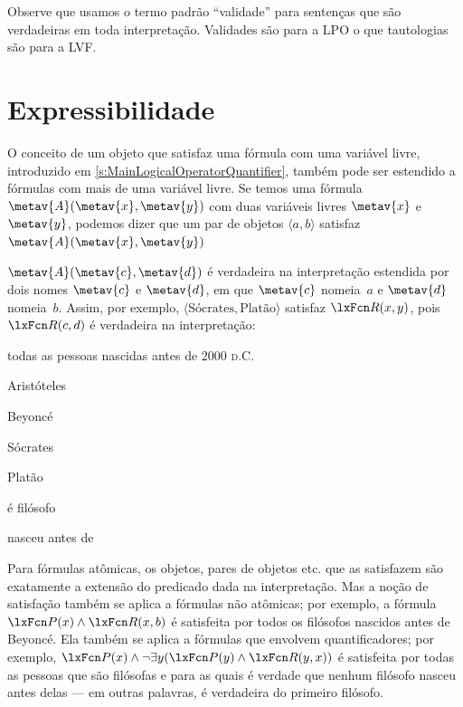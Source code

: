 Observe que usamos o termo padrão \textquotedblleft validade\textquotedblright{} para sentenças que são verdadeiras em toda interpretação. Validades são para a LPO o que tautologias são para a LVF.



\section{Expressibilidade}

O conceito de um objeto que satisfaz uma fórmula com uma variável livre, introduzido em \cref{s:MainLogicalOperatorQuantifier}, também pode ser estendido a fórmulas com mais de uma variável livre. Se temos uma fórmula $\metav{A}(\metav{x},\metav{y})$ com duas variáveis livres $\metav{x}$ e $\metav{y}$, podemos dizer que um par de objetos $\langle a,b\rangle$ satisfaz $\metav{A}(\metav{x},\metav{y})$




\ifeff{} $\metav{A}(\metav{c},\metav{d})$ é verdadeira na
interpretação estendida por dois nomes $\metav{c}$ e $\metav{d}$,
em que $\metav{c}$ nomeia~$a$ e $\metav{d}$ nomeia~$b$. Assim, por
exemplo, $\langle \text{Sócrates}, \text{Platão}\rangle$ satisfaz
$\atom{R}{x,y}$, pois $\atom{R}{c,d}$ é verdadeira na interpretação:

\begin{ekey}
\item[\text{domínio}] todas as pessoas nascidas antes de 2000 \textsc{d.C.}
	\item[a] Aristóteles
	\item[b] Beyonc\'e
	\item[c] Sócrates
	\item[d] Platão
\item[\atom{P}{x}]  é filósofo
\item[\atom{R}{x,y}]  nasceu antes de 
\end{ekey}
Para fórmulas atômicas, os objetos, pares de objetos etc. que as satisfazem são exatamente a extensão do predicado dada na interpretação. Mas a noção de satisfação também se aplica a fórmulas não atômicas; por exemplo, a fórmula $\atom{P}{x} \land \atom{R}{x,b}$ é satisfeita por todos os filósofos nascidos antes de Beyonc\'e. Ela também se aplica a fórmulas que envolvem quantificadores; por exemplo, $\atom{P}{x} \eand \lnot\exists y(\atom{P}{y} \land \atom{R}{y,x})$ é satisfeita por todas as pessoas que são filósofas e para as quais é verdade que nenhum filósofo nasceu antes delas — em outras palavras, é verdadeira do primeiro filósofo.

